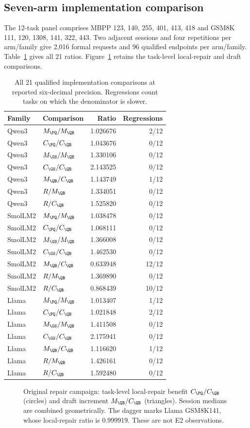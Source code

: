 \subsection{Seven-arm implementation comparison}
The 12-task panel comprises MBPP 123, 140, 255, 401, 413, 418 and GSM8K 111, 120, 1308, 141, 322, 443. Two adjacent sessions and four repetitions per arm/family give 2,016 formal requests and 96 qualified endpoints per arm/family. Table~\ref{tab:allcost} gives all 21 ratios. Figure~\ref{fig:taskcost} retains the task-level local-repair and draft comparisons.
\begin{table}[t]\centering\small
\caption{All 21 qualified implementation comparisons at reported six-decimal precision. Regressions count tasks on which the denominator is slower.}
\label{tab:allcost}
\begin{tabular}{@{}llrr@{}}\toprule
Family&Comparison&Ratio&Regressions\\\midrule
Qwen3 & $M_{\PQ}/M_{\QB}$ & 1.026676 & 2/12 \\
Qwen3 & $C_{\PQ}/C_{\QB}$ & 1.043676 & 0/12 \\
Qwen3 & $M_{\GS}/M_{\QB}$ & 1.330106 & 0/12 \\
Qwen3 & $C_{\GS}/C_{\QB}$ & 2.143525 & 0/12 \\
Qwen3 & $M_{\QB}/C_{\QB}$ & 1.143749 & 1/12 \\
Qwen3 & $R/M_{\QB}$ & 1.334051 & 0/12 \\
Qwen3 & $R/C_{\QB}$ & 1.525820 & 0/12 \\
SmolLM2 & $M_{\PQ}/M_{\QB}$ & 1.038478 & 0/12 \\
SmolLM2 & $C_{\PQ}/C_{\QB}$ & 1.068111 & 0/12 \\
SmolLM2 & $M_{\GS}/M_{\QB}$ & 1.366008 & 0/12 \\
SmolLM2 & $C_{\GS}/C_{\QB}$ & 1.462530 & 0/12 \\
SmolLM2 & $M_{\QB}/C_{\QB}$ & 0.633948 & 12/12 \\
SmolLM2 & $R/M_{\QB}$ & 1.369890 & 0/12 \\
SmolLM2 & $R/C_{\QB}$ & 0.868439 & 10/12 \\
Llama & $M_{\PQ}/M_{\QB}$ & 1.013407 & 1/12 \\
Llama & $C_{\PQ}/C_{\QB}$ & 1.021848 & 2/12 \\
Llama & $M_{\GS}/M_{\QB}$ & 1.411508 & 0/12 \\
Llama & $C_{\GS}/C_{\QB}$ & 2.175941 & 0/12 \\
Llama & $M_{\QB}/C_{\QB}$ & 1.116620 & 1/12 \\
Llama & $R/M_{\QB}$ & 1.426161 & 0/12 \\
Llama & $R/C_{\QB}$ & 1.592480 & 0/12 \\
\bottomrule\end{tabular}
\end{table}
\begin{figure}[t]\centering
\caption{Original repair campaign: task-level local-repair benefit $C_{\PQ}/C_{\QB}$ (circles) and draft increment $M_{\QB}/C_{\QB}$ (triangles). Session medians are combined geometrically. The dagger marks Llama GSM8K141, whose local-repair ratio is 0.999919. These are not E2 observations.}
\label{fig:taskcost}\end{figure}

